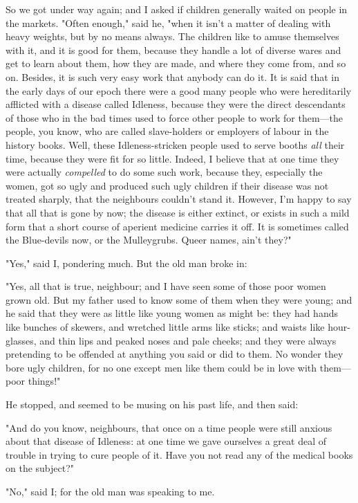 So we got under way again; and I asked if children generally waited on
people in the markets. "Often enough," said he, "when it isn't a matter
of dealing with heavy weights, but by no means always. The children like
to amuse themselves with it, and it is good for them, because they
handle a lot of diverse wares and get to learn about them, how they are
made, and where they come from, and so on. Besides, it is such very easy
work that anybody can do it. It is said that in the early days of our
epoch there were a good many people who were hereditarily afflicted with
a disease called Idleness, because they were the direct descendants of
those who in the bad times used to force other people to work for
them---the people, you know, who are called slave-holders or employers
of labour in the history books. Well, these Idleness-stricken people
used to serve booths \emph{all} their time, because they were fit for so
little. Indeed, I believe that at one time they were actually
\emph{compelled} to do some such work, because they, especially the
women, got so ugly and produced such ugly children if their disease was
not treated sharply, that the neighbours couldn't stand it. However, I'm
happy to say that all that is gone by now; the disease is either
extinct, or exists in such a mild form that a short course of aperient
medicine carries it off. It is sometimes called the Blue-devils now, or
the Mulleygrubs. Queer names, ain't they?"

"Yes," said I, pondering much. But the old man broke in:

"Yes, all that is true, neighbour; and I have seen some of those poor
women grown old. But my father used to know some of them when they were
young; and he said that they were as little like young women as might
be: they had hands like bunches of skewers, and wretched little arms
like sticks; and waists like hour-glasses, and thin lips and peaked
noses and pale cheeks; and they were always pretending to be offended at
anything you said or did to them. No wonder they bore ugly children, for
no one except men like them could be in love with them---poor things!"

He stopped, and seemed to be musing on his past life, and then said:

"And do you know, neighbours, that once on a time people were still
anxious about that disease of Idleness: at one time we gave ourselves a
great deal of trouble in trying to cure people of it. Have you not read
any of the medical books on the subject?"

"No," said I; for the old man was speaking to me.

